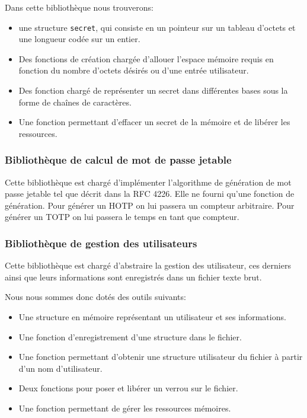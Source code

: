 Dans cette bibliothèque nous trouverons:
\begin{itemize}
  \item une structure \verb?secret?, qui consiste en un pointeur sur un tableau 
  d'octets et une longueur codée sur un entier.
  \item Des fonctions de création chargée d'allouer l'espace mémoire requis en
  fonction du nombre d'octets désirés ou d'une entrée utilisateur.
  \item Des fonction chargé de représenter un secret dans différentes bases
  sous la forme de chaînes de caractères.
  \item Une fonction permettant d'effacer un secret de la mémoire et de 
  libérer les ressources.
\end{itemize}

\subsubsection{Bibliothèque de calcul de mot de passe jetable}
Cette bibliothèque est chargé d'implémenter l'algorithme de génération de mot
passe jetable tel que décrit dans la RFC 4226\cite{HOTPrfc}. Elle ne fourni
qu'une fonction de génération. Pour générer un HOTP on lui passera un compteur
arbitraire. Pour générer un TOTP on lui passera le temps en tant que compteur.

\subsubsection{Bibliothèque de gestion des utilisateurs}
Cette bibliothèque est chargé d'abstraire la gestion des utilisateur, ces
derniers ainsi que leurs informations sont enregistrés dans un fichier texte
brut.

Nous nous sommes donc dotés des outils suivants:
\begin{itemize}
  \item Une structure en mémoire représentant un utilisateur et ses 
  informations.
  \item Une fonction d'enregistrement d'une structure dans le fichier.
  \item Une fonction permettant d'obtenir une structure utilisateur du fichier 
  à partir d'un nom d'utilisateur.
  \item Deux fonctions pour poser et libérer un verrou sur le fichier.
  \item Une fonction permettant de gérer les ressources mémoires.\\
\end{itemize}

